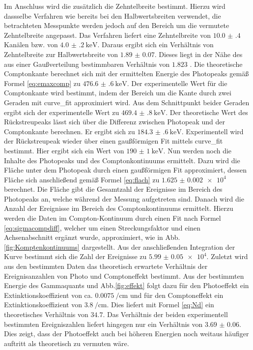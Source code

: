 Im Anschluss wird die zusätzlich die Zehntelbreite bestimmt. Hierzu wird dassselbe Verfahren wie bereits bei den Halbwertsbreiten verwendet, die betrachteten Messpunkte werden jedoch auf den Bereich um die vermutete Zehntelbreite angepasst. Das Verfahren liefert eine Zehntelbreite von $\num{10.0(4)}$ Kanälen bzw. von $\SI{4.0(2)}{\kilo\electronvolt}$. Daraus ergibt sich ein Verhältnis von Zehntelbreite zur Halbwertsbreite von $\num{1.89(7)}$. Dieses liegt in der Nähe des aus einer Gaußverteilung bestimmbaren Verhältnis von $\num{1.823}$  \cite{V18}. Die theoretische Comptonkante berechnet sich mit der ermittelten Energie des Photopeaks gemäß Formel \eqref{eq:emaxcomp} zu $\SI{476.6(6)}{\kilo\electronvolt}$. Der experimentelle Wert für die Comptonkante wird bestimmt, indem der Bereich um die Kante durch zwei Geraden mit curve\_fit \cite{scipy} approximiert wird. Aus dem Schnittpunkt beider Geraden ergibt sich der experimentelle Wert zu $\SI{469.4(8)}{\kilo\electronvolt}$. Der theoretische Wert des Rückstreupeaks lässt sich über die Differenz zwischen Photopeak und der Comptonkante berechnen. Er ergibt sich zu $\SI{184.3(6)}{\kilo\electronvolt}$. Experimentell wird der Rückstreupeak wieder über einen gaußförmigen Fit mittels curve\_fit bestimmt. Hier ergibt sich ein Wert von $\SI{190(1)}{\kilo\electronvolt}$. Nun werden noch die Inhalte des Photopeaks und des Comptonkontinuums ermittelt. Dazu wird die Fläche unter dem Photopeak durch einen gaußförmigen Fit approximiert, dessen Fläche sich anschließend gemäß Formel \eqref{eq:flach} zu $\num{1.625(2)e4}$ berechnet. Die Fläche gibt die Gesamtzahl der Ereignisse im Bereich des Photopeaks an, welche während der Messung aufgetreten sind. Danach wird die Anzahl der Ereignisse im Bereich des Comptonkontinuums ermittelt. Hierzu werden die Daten im Compton-Kontinuum durch einen Fit nach Formel \eqref{eq:sigmacompdiff}, welcher um einen Streckungsfaktor und einen Achsenabschnitt ergänzt wurde, approximiert, wie in Abb. \ref{fig:Komptenkontinuums} dargestellt. Aus der anschließenden Integration der Kurve bestimmt sich die Zahl der Ereignisse zu $\num{5.99(5)e4}$. Zuletzt wird aus den bestimmten Daten das theoretisch erwartete Verhältnis der Ereignisanzahlen von Photo und Comptoneffekt bestimmt. Aus der bestimmten Energie des Gammaquants und Abb.\ref{fig:effekt} folgt dazu für den Photoeffekt ein Extinktionskoeffizient von ca. $\SI{0.0075}{\per\centi\meter}$ und für den Comptoneffekt ein Extinktionskoeffizient von $\SI{3.8}{\per\centi\meter}$. Dies liefert mit Formel \eqref{eq:Nd} ein theoretisches Verhältnis von $34.7$. Das Verhältnis der beiden experimentell bestimmten Ereigniszahlen liefert hingegen nur ein Verhältnis von $\num{3.69(6)}$. Dies zeigt, dass der Photoeffekt auch bei höheren Energien noch weitaus häufiger auftritt als theoretisch zu vermuten wäre. 


